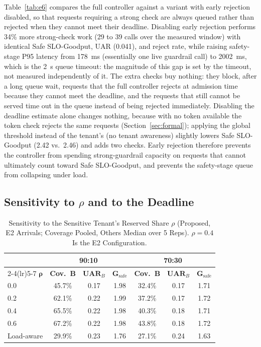 \documentclass[conference]{IEEEtran}
\newcommand{\Gsafe}{G_{\mathrm{safe}}}
\begin{document}
Table~\ref{tab:e6} compares the full controller against a variant with early rejection disabled, so that requests requiring a strong check are always queued rather than rejected when they cannot meet their deadline. Disabling early rejection performs 34\% more strong-check work (29 to 39 calls over the measured window) with identical Safe SLO-Goodput, UAR (0.041), and reject rate, while raising safety-stage P95 latency from 178~ms (essentially one live guardrail call) to 2002~ms, which is the 2~s queue timeout: the magnitude of this gap is set by the timeout, not measured independently of it. The extra checks buy nothing: they block, after a long queue wait, requests that the full controller rejects at admission time because they cannot meet the deadline, and the requests that still cannot be served time out in the queue instead of being rejected immediately. Disabling the deadline estimate alone changes nothing, because with no token available the token check rejects the same requests (Section~\ref{sec:formal}); applying the global threshold instead of the tenant's (no tenant awareness) slightly lowers Safe SLO-Goodput (2.42 vs.\ 2.46) and adds two checks. Early rejection therefore prevents the controller from spending strong-guardrail capacity on requests that cannot ultimately count toward Safe SLO-Goodput, and prevents the safety-stage queue from collapsing under load.

\subsection{Sensitivity to $\rho$ and to the Deadline}
\label{sec:sens}

\begin{table}[t]
\caption{Sensitivity to the Sensitive Tenant's Reserved Share $\rho$ (Proposed, E2 Arrivals; Coverage Pooled, Others Median over 5 Reps). $\rho=0.4$ Is the E2 Configuration.}
\label{tab:rho}
\centering
\scriptsize
\setlength{\tabcolsep}{3pt}
\begin{tabular}{lcccccc}
\toprule
 & \multicolumn{3}{c}{\textbf{90:10}} & \multicolumn{3}{c}{\textbf{70:30}} \\
\cmidrule(lr){2-4}\cmidrule(lr){5-7}
$\boldsymbol{\rho}$ & \textbf{Cov.\ B} & $\mathbf{UAR}_B$ & $\boldsymbol{\Gsafe}$ & \textbf{Cov.\ B} & $\mathbf{UAR}_B$ & $\boldsymbol{\Gsafe}$ \\
\midrule
0.0 & 45.7\% & 0.17 & 1.98 & 32.4\% & 0.17 & 1.71 \\
0.2 & 62.1\% & 0.22 & 1.99 & 37.2\% & 0.17 & 1.72 \\
0.4 & 65.5\% & 0.22 & 1.98 & 40.3\% & 0.18 & 1.71 \\
0.6 & 67.2\% & 0.22 & 1.98 & 43.8\% & 0.18 & 1.72 \\
\midrule
Load-aware & 29.9\% & 0.23 & 1.76 & 27.1\% & 0.24 & 1.63 \\
\bottomrule
\end{tabular}
\end{table}
\end{document}
